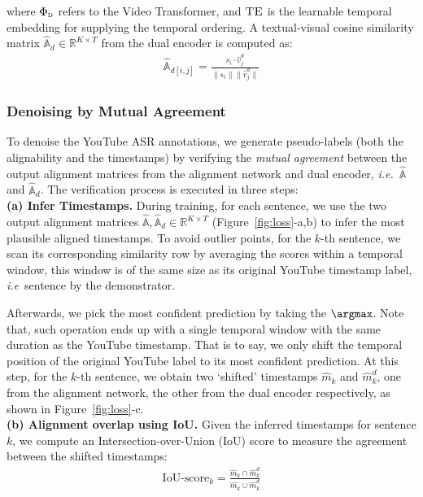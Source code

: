 \noindent where $\Phi_{\textsc{d}}$ refers to the Video Transformer, 
and $\textsc{TE}$ is the learnable temporal embedding for supplying the temporal ordering.
A textual-visual cosine similarity matrix $\hat{\mathbb{A}}_d\in \mathbb{R}^{K \times T}$ 
from the dual encoder is computed as:
\vspace{-3mm}
\begin{align}
    {\hat{\mathbb{A}}}_{d [i,j]}  = \frac{s_i \cdot \hat{v}^{d}_{j}}{\|s_i\| \|\hat{v}^{d}_{j}\|}
\end{align}
\vspace{-9mm}

\subsubsection{Denoising by Mutual Agreement}\label{subsubsec:denoising}
\vspace{-1mm}
To denoise the YouTube ASR annotations,
we generate pseudo-labels (both the alignability and the timestamps) 
by verifying the \textit{mutual agreement} between the output alignment matrices 
from the alignment network and dual encoder, {\em i.e.}~$\hat{\mathbb{A}}$ and $\hat{\mathbb{A}}_d$.
The verification process is executed in three steps: \\[-4pt]

\vspace{-2mm}
\noindent \textbf{(a) Infer Timestamps. }
During training, for each sentence,
we use the two output alignment matrices $\hat{\mathbb{A}},\hat{\mathbb{A}}_d \in \mathbb{R}^{K \times T}$ (Figure~\ref{fig:loss}-a,b) to infer the most plausible aligned timestamps.
To avoid outlier points, for the $k$-th sentence, 
we scan its corresponding similarity row by averaging the scores within a temporal window, 
this window is of the same size as its original YouTube timestamp label, {\em i.e}~sentence by the demonstrator.

Afterwards, 
we pick the most confident prediction by taking the $\argmax$.
Note that, 
such operation ends up with a single temporal window
with the same duration as the YouTube timestamp.
That is to say, 
we only shift the temporal position of the original YouTube label to its most confident prediction.
At this step, for the $k$-th sentence, 
we obtain two `shifted' timestamps $\hat{m}_k$ and $\hat{m}^d_k$,
one from the alignment network, 
the other from the dual encoder respectively, 
as shown in Figure~\ref{fig:loss}-c.  \\[-4pt]

\vspace{-2mm}
\noindent \textbf{(b) Alignment overlap using IoU. }
Given the inferred timestamps for sentence $k$,
we compute an Intersection-over-Union (IoU) score to measure 
the agreement between the shifted timestamps: 
\vspace{-4mm}
\begin{align}
\text{IoU-score}_k = \frac
{\hat{m}_{k} \cap \hat{m}^d_{k}}
{\hat{m}_{k} \cup \hat{m}^d_{k}}
\end{align}
\vspace{-5mm}

